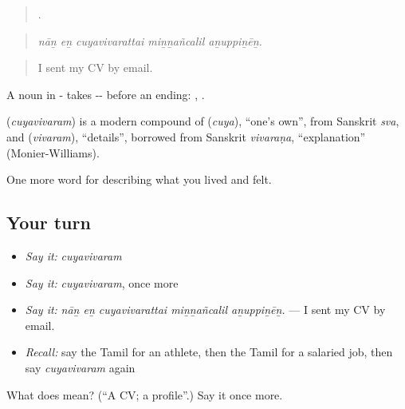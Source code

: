 \begin{quote}
    .
\end{quote}

\begin{quote}
\emph{nāṉ eṉ cuyavivarattai miṉṉañcalil aṉuppiṉēṉ.}
\end{quote}

\begin{quote}
I sent my CV by email.
\end{quote}

A noun in - takes -- before an ending: , .

\begin{cousinweb}
\textbf{} (\emph{cuyavivaram}) is a modern compound of  (\emph{cuya}), \textquotedblleft{}one's own\textquotedblright{}, from Sanskrit \emph{sva}, and  (\emph{vivaram}), \textquotedblleft{}details\textquotedblright{}, borrowed from Sanskrit \emph{vivaraṇa}, \textquotedblleft{}explanation\textquotedblright{} (Monier-Williams).
\end{cousinweb}

\begin{grammarlens}[title={What you've built}]
One more word for describing what you lived and felt.
\end{grammarlens}

\subsection*{Your turn}
\begin{itemize}
\raggedright
  \item \emph{Say it:} \emph{cuyavivaram}
  \item \emph{Say it:} \emph{cuyavivaram}, once more
  \item \emph{Say it:} \emph{nāṉ eṉ cuyavivarattai miṉṉañcalil aṉuppiṉēṉ.} — I sent my CV by email.
  \item \emph{Recall:} say the Tamil for an athlete, then the Tamil for a salaried job, then say \emph{cuyavivaram} again
\end{itemize}

\begin{tcolorbox}[breakable,colback=teal!4,colframe=teal!35!black,title={Before you move on}]
What does  mean? (\textquotedblleft{}A CV; a profile\textquotedblright{}.) Say it once more.
\end{tcolorbox}
